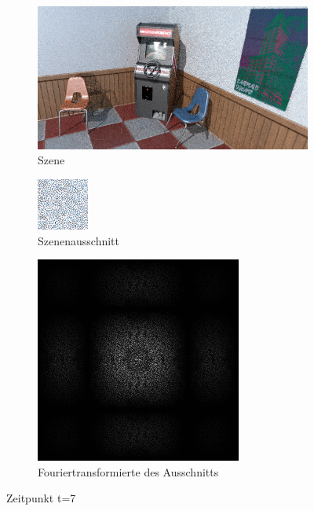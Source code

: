 \begin{figure}[H]
    \begin{subfigure}{\textwidth}   
        \centering \includegraphics[scale=.25]{content/TemporalerAlg/Bilder/Sorting/Screenshots/seed_debug_9.0_selection.png}
        \caption{Szene}
        \label{fig:Nur_Sorting_Szene_t7}
    \end{subfigure}
    \begin{subfigure}{0.5\textwidth}
        \centering\includegraphics[width=0.4\linewidth]{content/TemporalerAlg/Bilder/Sorting/Screenshots/seed_debug_9.0_ausschnitt.png} 
        \caption{Szenenausschnitt}
        \label{fig:Nur_Sorting_ausschnitt_t7}
    \end{subfigure}
    \begin{subfigure}{0.5\textwidth}
        \centering\includegraphics[width=0.4\linewidth]{content/TemporalerAlg/Bilder/Sorting/Screenshots/Spektren/seed_debug_9.0_ausschnitt.png}
        \caption{Fouriertransformierte des Ausschnitts}
        \label{fig:Nur_Sorting_Fouriertransformierte_t7}
    \end{subfigure}
        \caption{Zeitpunkt t=7}
        \label{fig:Nur_Sorting_Verlauf_t7}
\end{figure}


